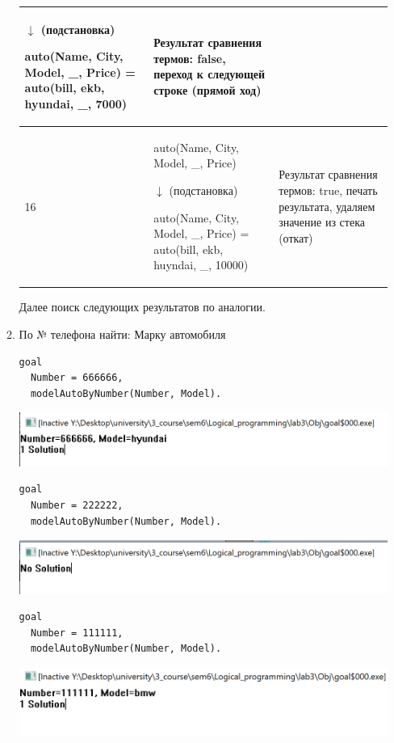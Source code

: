 \documentclass[a4paper,14pt]{extreport} %
\begin{document}
\begin{enumerate}
\begin{enumerate}
\begin{longtable}{|p{1.1cm}|p{8.5cm}|p{7cm}|}
		$\downarrow$  (подстановка)
	
	auto(Name, City, Model, \_, Price) = auto(bill, ekb, hyundai, \_, 7000) & Результат сравнения термов: false, переход к следующей строке (прямой ход) \\ \hline
	
	16 & auto(Name, City, Model, \_, Price) 
	
		$\downarrow$  (подстановка)
	
	auto(Name, City, Model, \_, Price) = auto(bill, ekb, huyndai, \_, 10000) & Результат сравнения термов: true, печать результата, удаляем значение из стека (откат) \\ \hline
\end{longtable}

Далее поиск следующих результатов по аналогии. 

\item По № телефона найти: Марку автомобиля

\begin{lstlisting}[caption=Пример 1 задание 1b]
goal
  Number = 666666,
  modelAutoByNumber(Number, Model).
\end{lstlisting}

\includegraphics[scale=0.8]{ex4}

\begin{lstlisting}[caption=Пример 2 задание 1b]
goal
  Number = 222222,
  modelAutoByNumber(Number, Model).
\end{lstlisting}

\includegraphics[scale=0.8]{ex5}

\begin{lstlisting}[caption=Пример 3 задание 1b]
goal
  Number = 111111,
  modelAutoByNumber(Number, Model).
\end{lstlisting}

\includegraphics[scale=0.8]{ex6}


\end{enumerate}
\end{enumerate}
\end{document}
